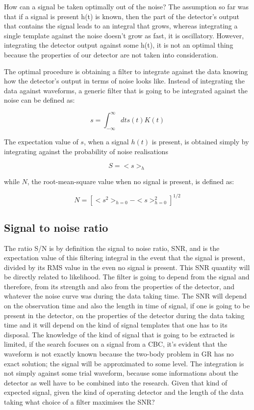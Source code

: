 \documentclass[binding=0.6cm, LaM]{sapthesis}
\begin{document}
	How can a signal be taken optimally out of the noise? 
	The assumption so far was that if a signal is present h(t) is known, 
	then the part of the detector’s output that contains the signal leads to 
	an integral that grows, whereas integrating a single template against the noise doesn’t grow as fast, it is oscillatory.
	However, integrating the detector output against some h(t), 
	it is not an optimal thing because the properties of our detector are not taken into consideration. 

	The optimal procedure is obtaining a filter to integrate against the data knowing how the detector’s output in terms of noise looks like. 
	Instead of integrating the data against waveforms, a generic filter that is going to be integrated against the noise can be defined as:
		
		\begin{equation}
 		s = \int^{\infty}_{-\infty} dt s(t) K(t)
		\end{equation}

	The expectation value of $s$, when a signal $h(t)$ is present, is obtained simply by integrating against the probability of noise realisations

		\begin{equation}
		S = <s>_{h}
		\end{equation}

	while $N$, the root-mean-square value when no signal is present, is defined as:

		\begin{equation}
		N = [<s^2>_{h=0} - <s>^2_{h=0}]^{1/2}
		\end{equation}

\subsection{Signal to noise ratio}

	The ratio S/N is by definition the signal to noise ratio, SNR, 	
	and is the expectation value of this filtering integral in the event that the signal is present, 
	divided by its RMS value in the even no signal is present.
	This SNR quantity will be directly related to likelihood. 
	The filter is going to depend from the signal and therefore, 
	from its strength and also from the properties of the detector, 
	and whatever the noise curve was during the data taking time. 
	The SNR will depend on the observation time and also the length in time of signal, 
	if one is going to be present in the detector, 
	on the properties of the detector during the data taking time and 
	it will depend on the kind of signal templates that one has to its disposal. 
	The knowledge of the kind of signal that is going to be extracted is limited,  
	if the search focuses on a signal from a CBC, 
	it’s evident that the waveform is not exactly known because the two-body problem in GR 
	has no exact solution; the signal will be approximated to some level.
	The integration is not simply against some trial waveform, 
	because some informations about the detector as well have to be combined into the research. 
	Given that kind of expected signal, 
	given the kind of operating detector and the length of the data taking what choice of a filter maximises the SNR?
\end{document}
